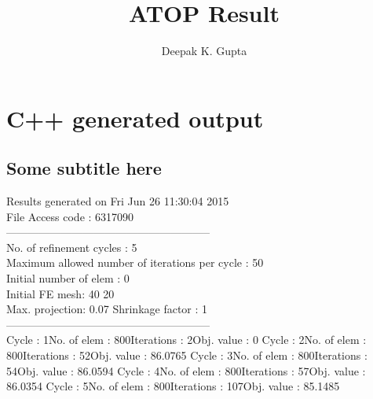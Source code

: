 \documentclass{article}
\title{ATOP Result}
\author{Deepak K. Gupta}
\begin{document}
\maketitle
\section{C++ generated output}
\subsection{Some subtitle here}
{\selectfont
Results generated  on Fri Jun 26 11:30:04 2015
\\File Access code : 6317090\\ 
--------------------------------------------------------\\ 
No. of refinement cycles : 5\\
Maximum allowed number of iterations per cycle : 50\\
Initial number of elem : 0\\ 
Initial FE mesh: 40 20\\ 
Max. projection: 0.07 Shrinkage factor : 1\\ 
--------------------------------------------------------\\ 
Cycle : 1\qquad No. of elem : 800\qquad Iterations : 2\qquad Obj. value : 0\qquad 
Cycle : 2\qquad No. of elem : 800\qquad Iterations : 52\qquad Obj. value : 86.0765\qquad 
Cycle : 3\qquad No. of elem : 800\qquad Iterations : 54\qquad Obj. value : 86.0594\qquad 
Cycle : 4\qquad No. of elem : 800\qquad Iterations : 57\qquad Obj. value : 86.0354\qquad 
Cycle : 5\qquad No. of elem : 800\qquad Iterations : 107\qquad Obj. value : 85.1485\qquad 
}
\begin{figure}[H] 
\centering 
\begin{subfigure}{.45\linewidth} \centering 
{}  
\end{subfigure}  
\hfill  
\begin{subfigure}{.45\linewidth} \centering 
{}  
\end{subfigure}  
\end{figure}  
\end{document}
